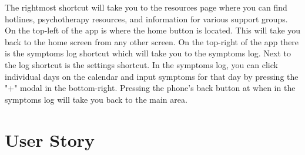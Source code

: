 \documentclass[letterpaper,12pt,titlepage]{article}
\begin{document}
\newline
The rightmost shortcut will take you to the resources page where you can find hotlines, psychotherapy resources, and information for various support groups.
\newline
\newline
On the top-left of the app is where the home button is located. This will take you back to the home screen from any other screen.
\newline
\newline
On the top-right of the app there is the symptoms log shortcut which will take you to the symptoms log.
\newline
\newline
Next to the log shortcut is the settings shortcut.
\newline
\newline
In the symptoms log, you can click individual days on the calendar and input symptoms for that day by pressing the "+" modal in the bottom-right.
\newline
\newline
Pressing the phone's back button at when in the symptoms log will take you back to the main area.

\newpage
\section{User Story}
\end{document}
